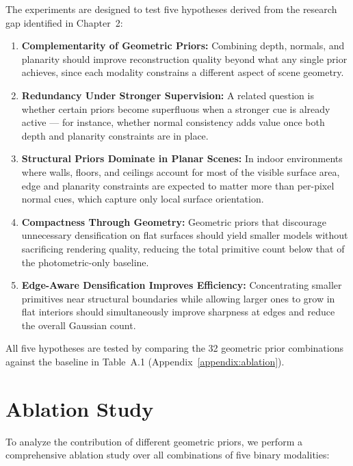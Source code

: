The experiments are designed to test five hypotheses derived from the research gap identified in Chapter~2:

\begin{enumerate}
    \item \textbf{Complementarity of Geometric Priors:} Combining depth, normals, and planarity should improve reconstruction quality beyond what any single prior achieves, since each modality constrains a different aspect of scene geometry.

    \item \textbf{Redundancy Under Stronger Supervision:} A related question is whether certain priors become superfluous when a stronger cue is already active — for instance, whether normal consistency adds value once both depth and planarity constraints are in place.

    \item \textbf{Structural Priors Dominate in Planar Scenes:} In indoor environments where walls, floors, and ceilings account for most of the visible surface area, edge and planarity constraints are expected to matter more than per-pixel normal cues, which capture only local surface orientation.

    \item \textbf{Compactness Through Geometry:} Geometric priors that discourage unnecessary densification on flat surfaces should yield smaller models without sacrificing rendering quality, reducing the total primitive count below that of the photometric-only baseline.

    \item \textbf{Edge-Aware Densification Improves Efficiency:} Concentrating smaller primitives near structural boundaries while allowing larger ones to grow in flat interiors should simultaneously improve sharpness at edges and reduce the overall Gaussian count.
\end{enumerate}

All five hypotheses are tested by comparing the 32 geometric prior combinations against the baseline in Table~A.1 (Appendix~\ref{appendix:ablation}).

\section{Ablation Study}

To analyze the contribution of different geometric priors, we perform a comprehensive ablation study over all combinations of five binary modalities:

